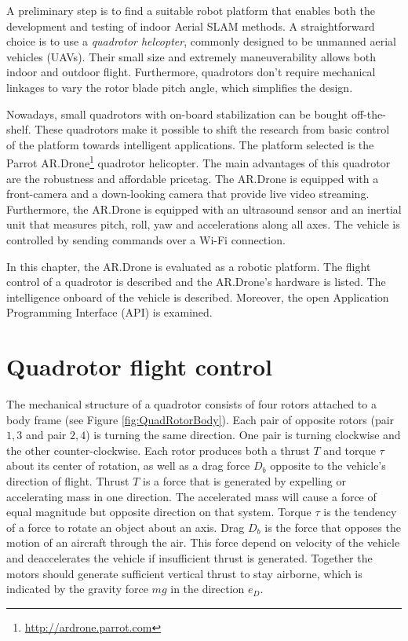 A preliminary step is to find a suitable robot platform that enables both the development and testing of indoor Aerial SLAM methods.
A straightforward choice is to use a \textit{quadrotor helcopter}, commonly designed to be unmanned aerial vehicles (UAVs).
Their small size and extremely maneuverability allows both indoor and outdoor flight.
Furthermore, quadrotors don't require mechanical linkages to vary the rotor blade pitch angle, which simplifies the design.

Nowadays, small quadrotors with on-board stabilization can be bought off-the-shelf.
These quadrotors make it possible to shift the research from basic control of the platform towards intelligent applications.
The platform selected is the Parrot AR.Drone\footnote{\url{http://ardrone.parrot.com}} quadrotor helicopter.
The main advantages of this quadrotor are the robustness and affordable pricetag.
The AR.Drone is equipped with a front-camera and a down-looking camera that provide live video streaming.
Furthermore, the AR.Drone is equipped with an ultrasound sensor and an inertial unit that measures pitch, roll, yaw and accelerations along all axes.
The vehicle is controlled by sending commands over a Wi-Fi connection.

In this chapter, the AR.Drone is evaluated as a robotic platform.
The flight control of a quadrotor is described and the AR.Drone's hardware is listed.
The intelligence onboard of the vehicle is described.
Moreover, the open Application Programming Interface (API) is examined.



\section{Quadrotor flight control}
The mechanical structure of a quadrotor consists of four rotors attached to a body frame (see Figure \ref{fig:QuadRotorBody}).
Each pair of opposite rotors (pair ${1, 3}$ and pair ${2, 4}$) is turning the same direction.
One pair is turning clockwise and the other counter-clockwise.
Each rotor produces both a thrust $T$ and torque $\tau$ about its center of rotation, as well as a drag force $D_b$ opposite to the vehicle's direction of flight.
Thrust $T$ is a force that is generated by expelling or accelerating mass in one direction.
The accelerated mass will cause a force of equal magnitude but opposite direction on that system.
Torque $\tau$ is the tendency of a force to rotate an object about an axis.
Drag $D_b$ is the force that opposes the motion of an aircraft through the air.
This force depend on velocity of the vehicle and deaccelerates the vehicle if insufficient thrust is generated.
Together the motors should generate sufficient vertical thrust to stay airborne, which is indicated by the gravity force $mg$ in the direction $e_D$.

